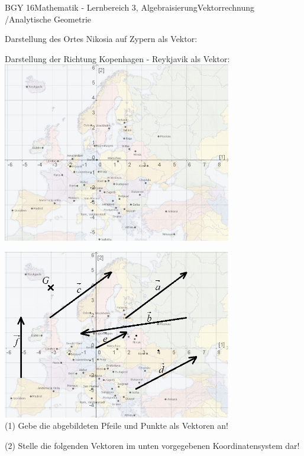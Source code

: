 \documentclass[oneside,openany,headings=optiontotoc,11pt,numbers=noenddot]{scrreprt}
\begin{document}
	\begin{worksheet}{BGY 16}{Mathematik - Lernbereich 3, Algebraisierung}{Vektorrechnung /Analytische Geometrie}
				
		\noindent
		\sffamily
		\begin{framed}
			\noindent
			Darstellung des Ortes \glqq{}Nikosia\grqq{} auf Zypern als Vektor:\\
			\par
			\bigskip
			\noindent
			Darstellung der Richtung \glqq{}Kopenhagen - Reykjavik\grqq{} als Vektor:\\
			\includegraphics[width=0.75\textwidth]{MapKoord.jpg}			
		\end{framed}
		\begin{framed}
			\noindent
			\includegraphics[width=0.75\textwidth]{MapVec.jpg}\\
			(1) Gebe die abgebildeten Pfeile und Punkte als Vektoren an!\\
			\par
			\bigskip
			\noindent
			(2) Stelle die folgenden Vektoren im unten vorgegebenen Koordinatensystem dar!\\

\end{framed}
\end{worksheet}
\end{document}
